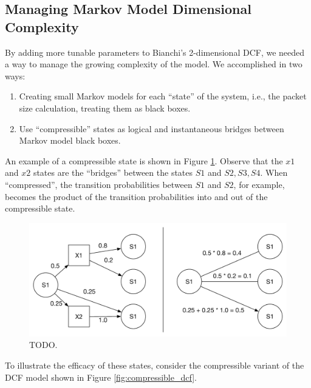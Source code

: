 \documentclass{llncs}
\begin{document}
\subsection{Managing Markov Model Dimensional Complexity}
By adding more tunable parameters to Bianchi's 2-dimensional DCF, we needed a way to manage the growing complexity of the model. We accomplished in two ways:
\begin{enumerate}
	\item Creating small Markov models for each ``state'' of the system, i.e., the packet size calculation, treating them as black boxes.
	\item Use ``compressible'' states as logical and instantaneous bridges between Markov model black boxes.
\end{enumerate}
An example of a compressible state is shown in Figure \ref{fig:collapses}. Observe that the $x1$ and $x2$ states are the ``bridges'' between the states $S1$ and $S2,S3,S4$. When ``compressed'', the transition probabilities between $S1$ and $S2$, for example, becomes the product of the transition probabilities into and out of the compressible state. 

\begin{figure}
\begin{center}
\includegraphics[scale=0.35]{../../sketches/collapses.pdf}
\caption{TODO.}
\label{fig:collapses}
\end{center}
\end{figure}

To illustrate the efficacy of these states, consider the compressible variant of the DCF model shown in Figure \ref{fig:compressible_dcf}.
\end{document}
